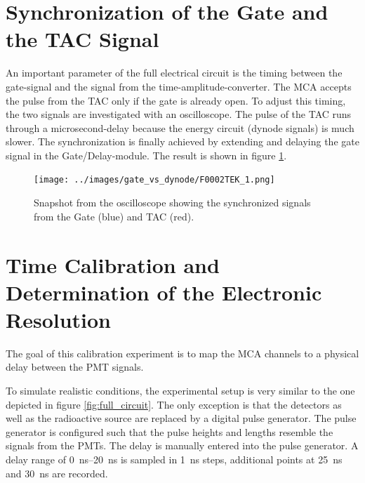\documentclass[
	paper=A4,
	parskip=full,
	chapterprefix=true,
	11pt,
	headings=normal,
	bibliography=totoc,
	listof=totoc,
	titlepage=on,
]{scrreprt}
\begin{document}
\section{Synchronization of the Gate and the TAC Signal}
An important parameter of the full electrical circuit is the timing between the gate-signal and the signal from the time-amplitude-converter. The MCA accepts the pulse from the TAC only if the gate is already open. To adjust this timing, the two signals are investigated with an oscilloscope. The pulse of the TAC runs through a microsecond-delay because the energy circuit (dynode signals) is much slower. The synchronization is finally achieved by extending and delaying the gate signal in the Gate/Delay-module. The result is shown in figure \ref{fig:GateDynode_sync}.

\begin{figure}[h]
	\centering
	\texttt{[image: ../images/gate\_vs\_dynode/F0002TEK\_1.png]}
	\caption{Snapshot from the oscilloscope showing the synchronized signals from the Gate (blue) and TAC (red).}
	\label{fig:GateDynode_sync}
\end{figure}

\FloatBarrier
\section{Time Calibration and Determination of the Electronic Resolution}
\label{time_calib}
The goal of this calibration experiment is to map the MCA channels to a physical delay between the PMT signals. 

To simulate realistic conditions, the experimental setup is very similar to the one depicted in figure \ref{fig:full_circuit}. The only  exception is that the detectors as well as the radioactive source are replaced by a digital pulse generator. The pulse generator is configured such that the pulse heights and lengths resemble the signals from the PMTs.  
The delay is manually entered into the pulse generator. A delay range of \SIrange{0}{20}{\nano\second} is sampled in \SI{1}{\nano\second} steps, additional points at \SI{25}{\nano\second} and \SI{30}{\nano\second} are recorded.
\end{document}
